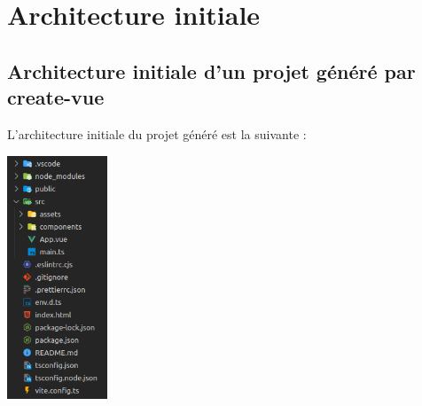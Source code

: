 \section{Architecture initiale}
\subsection{Architecture initiale d'un projet généré par create-vue}
L'architecture initiale du projet généré est la suivante :
\begin{center}
\includegraphics[width=3cm]{images/image05.png}
\end{center}

